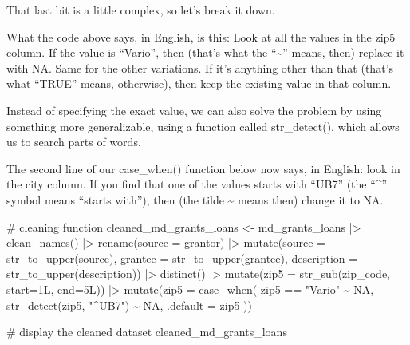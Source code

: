 \documentclass[
  letterpaper,
  DIV=11,
  numbers=noendperiod]{scrreprt}
\newenvironment{Shaded}{\begin{snugshade}}{\end{snugshade}}
\newcommand{\AttributeTok}[1]{\textcolor[rgb]{0.40,0.45,0.13}{#1}}
\newcommand{\CommentTok}[1]{\textcolor[rgb]{0.37,0.37,0.37}{#1}}
\newcommand{\ConstantTok}[1]{\textcolor[rgb]{0.56,0.35,0.01}{#1}}
\newcommand{\FunctionTok}[1]{\textcolor[rgb]{0.28,0.35,0.67}{#1}}
\newcommand{\NormalTok}[1]{\textcolor[rgb]{0.00,0.23,0.31}{#1}}
\newcommand{\OtherTok}[1]{\textcolor[rgb]{0.00,0.23,0.31}{#1}}
\newcommand{\SpecialCharTok}[1]{\textcolor[rgb]{0.37,0.37,0.37}{#1}}
\newcommand{\StringTok}[1]{\textcolor[rgb]{0.13,0.47,0.30}{#1}}
\begin{document}
That last bit is a little complex, so let's break it down.

What the code above says, in English, is this: Look at all the values in
the zip5 column. If the value is ``Vario'', then (that's what the
``\textasciitilde{}'' means, then) replace it with NA. Same for the
other variations. If it's anything other than that (that's what ``TRUE''
means, otherwise), then keep the existing value in that column.

Instead of specifying the exact value, we can also solve the problem by
using something more generalizable, using a function called
str\_detect(), which allows us to search parts of words.

The second line of our case\_when() function below now says, in English:
look in the city column. If you find that one of the values starts with
``UB7'' (the ``\^{}'' symbol means ``starts with''), then (the tilde
\textasciitilde{} means then) change it to NA.

\begin{Shaded}
\begin{Highlighting}[]
\CommentTok{\# cleaning function}
\NormalTok{cleaned\_md\_grants\_loans }\OtherTok{\textless{}{-}}\NormalTok{ md\_grants\_loans }\SpecialCharTok{|\textgreater{}}
  \FunctionTok{clean\_names}\NormalTok{() }\SpecialCharTok{|\textgreater{}} 
  \FunctionTok{rename}\NormalTok{(}\AttributeTok{source =}\NormalTok{ grantor) }\SpecialCharTok{|\textgreater{}} 
  \FunctionTok{mutate}\NormalTok{(}\AttributeTok{source =} \FunctionTok{str\_to\_upper}\NormalTok{(source), }\AttributeTok{grantee =} \FunctionTok{str\_to\_upper}\NormalTok{(grantee), }\AttributeTok{description =} \FunctionTok{str\_to\_upper}\NormalTok{(description)) }\SpecialCharTok{|\textgreater{}} 
  \FunctionTok{distinct}\NormalTok{() }\SpecialCharTok{|\textgreater{}}
  \FunctionTok{mutate}\NormalTok{(}\AttributeTok{zip5 =} \FunctionTok{str\_sub}\NormalTok{(zip\_code, }\AttributeTok{start=}\NormalTok{1L, }\AttributeTok{end=}\NormalTok{5L)) }\SpecialCharTok{|\textgreater{}}
  \FunctionTok{mutate}\NormalTok{(}\AttributeTok{zip5 =} \FunctionTok{case\_when}\NormalTok{(}
\NormalTok{    zip5 }\SpecialCharTok{==} \StringTok{"Vario"} \SpecialCharTok{\textasciitilde{}} \ConstantTok{NA}\NormalTok{,}
    \FunctionTok{str\_detect}\NormalTok{(zip5, }\StringTok{"\^{}UB7"}\NormalTok{) }\SpecialCharTok{\textasciitilde{}} \ConstantTok{NA}\NormalTok{,}
    \AttributeTok{.default =}\NormalTok{ zip5}
\NormalTok{  ))}

\CommentTok{\# display the cleaned dataset}
\NormalTok{cleaned\_md\_grants\_loans}
\end{Highlighting}
\end{Shaded}
\end{document}
